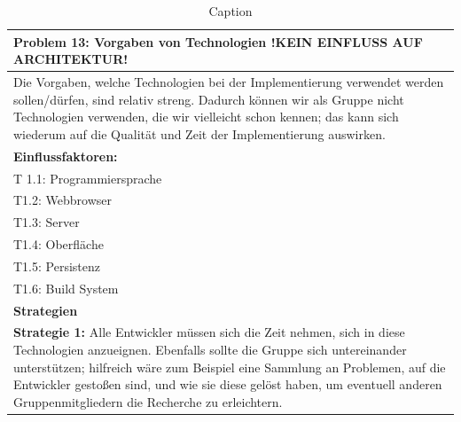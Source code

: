 \documentclass[enabledeprecatedfontcommands,fontsize=12pt,paper=a4,twoside]{scrartcl}
\begin{document}
\begin{table}[]
    \centering
    \begin{tabular}{|p{15cm}|}
    \hline
          \textbf{Problem 13:} Vorgaben von Technologien !KEIN EINFLUSS AUF ARCHITEKTUR!
          \\ \hline
          Die Vorgaben, welche Technologien bei der Implementierung verwendet werden sollen/dürfen, sind relativ streng. Dadurch können wir als Gruppe nicht Technologien verwenden, die wir vielleicht schon kennen; das kann sich wiederum auf die Qualität und Zeit der Implementierung auswirken.
          \\ \hline
          \textbf{Einflussfaktoren: } \\
          T 1.1: Programmiersprache \\
          T1.2: Webbrowser \\
          T1.3: Server \\
          T1.4: Oberfläche \\
          T1.5: Persistenz \\
          T1.6: Build System \\
          \hline
          \textbf{Strategien} \\ \hline
          \textbf{Strategie 1:} Alle Entwickler müssen sich die Zeit nehmen, sich in diese Technologien anzueignen. Ebenfalls sollte die Gruppe sich untereinander unterstützen; hilfreich wäre zum Beispiel eine Sammlung an Problemen, auf die Entwickler gestoßen sind, und wie sie diese gelöst haben, um eventuell anderen Gruppenmitgliedern die Recherche zu erleichtern.
          \\ \hline
    \end{tabular}
    \caption{Caption}
    \label{tab:my_label}
\end{table}
\end{document}
